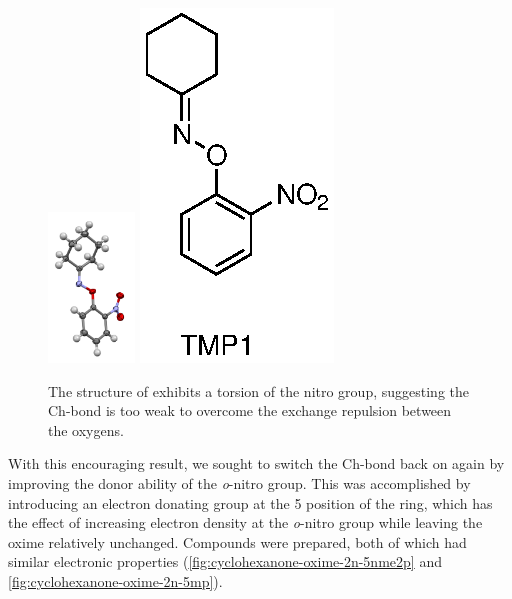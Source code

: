 \begin{refsection}
\begin{figure}
\centering
\includegraphics[height=4cm]{Figures/cyclohexanone-oxime-2np.png}
\includegraphics[scale=0.8]{Figures/cyclohexanone-oxime-2np.eps}
\caption[]{The structure of  exhibits a torsion of the nitro group, suggesting the Ch-bond is too weak to overcome the exchange repulsion between the oxygens.}
\label{fig:cyclohexanone-oxime-2np}
\end{figure}

With this encouraging result, we sought to switch the Ch-bond back on again by improving the donor ability of the \emph{o}-nitro group.
This was accomplished by introducing an electron donating group at the 5 position of the ring, which has the effect of increasing electron density at the \emph{o}-nitro group while leaving the oxime relatively unchanged.
Compounds  were prepared, both of which had similar electronic properties (\ref{fig:cyclohexanone-oxime-2n-5nme2p} and \ref{fig:cyclohexanone-oxime-2n-5mp}). 


\end{refsection}

